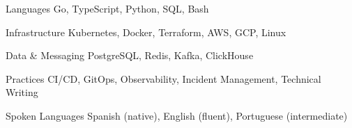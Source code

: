 

\begin{cvskills}

  \cvskill
    {Languages} %
    {Go, TypeScript, Python, SQL, Bash} %

  \cvskill
    {Infrastructure} %
    {Kubernetes, Docker, Terraform, AWS, GCP, Linux} %

  \cvskill
    {Data \& Messaging} %
    {PostgreSQL, Redis, Kafka, ClickHouse} %

  \cvskill
    {Practices} %
    {CI/CD, GitOps, Observability, Incident Management, Technical Writing} %

  \cvskill
    {Spoken Languages} %
    {Spanish (native), English (fluent), Portuguese (intermediate)} %

\end{cvskills}
